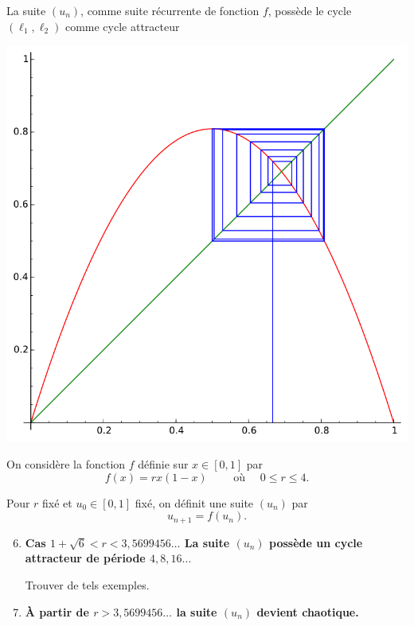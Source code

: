 \begin{frame}
  La suite $(u_n)$, comme suite récurrente de fonction $f$, possède 
  le cycle $(\ell_1,\ell_2)$ comme cycle attracteur
  \begin{center}
  \includegraphics[scale=0.5]{figures/chaos9}
  \end{center} 

\end{frame}


\begin{frame}
\begin{tp}
On considère la fonction $f$ définie sur $x \in [0,1]$ par 
$$f(x)=rx(1-x) \qquad \text{ où } \quad 0 \le  r \le 4.$$

Pour $r$ fixé et $u_0 \in [0,1]$ fixé, on définit une suite $(u_n)$ par
$$u_{n+1} = f(u_n).$$

\begin{enumerate}
\setcounter{enumi}{5} 
 \item \textbf{Cas $1+\sqrt{6}<r<3, 5699456\ldots$ La suite $(u_n)$ possède 
  un cycle attracteur de période $4,8,16...$}
  
  Trouver de tels exemples.    

  \item \textbf{\`A partir de $r > 3, 5699456\ldots$ la suite $(u_n)$ devient chaotique.}



  \end{enumerate}
\end{tp}
\end{frame}



